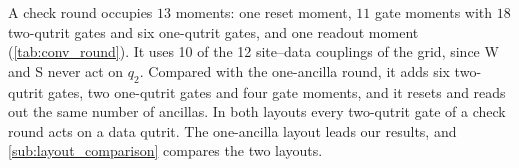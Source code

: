 A check round occupies $13$ moments: one reset moment, $11$ gate moments with $18$ two-qutrit gates and six one-qutrit gates, and one readout moment (\autoref{tab:conv_round}). It uses 10 of the 12 site--data couplings of the grid, since W and S never act on $q_2$. Compared with the one-ancilla round, it adds six two-qutrit gates, two one-qutrit gates and four gate moments, and it resets and reads out the same number of ancillas. In both layouts every two-qutrit gate of a check round acts on a data qutrit. The one-ancilla layout leads our results, and \autoref{sub:layout_comparison} compares the two layouts.

